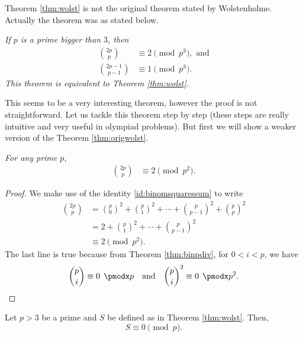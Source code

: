 \documentclass[12pt]{subfile}
\begin{document}
		\begin{remark}
			Theorem \eqref{thm:wolst} is not the original theorem stated by Wolstenholme. Actually the theorem was as stated below.
		\end{remark}
	
		\begin{theorem}\slshape\label{thm:origwolst}
			If $p$ is a prime bigger than $3$, then
			\begin{align*}
				\binom{2p}{p} & \equiv2\pmod{p^3}, \text{ and}\\
				\binom{2p-1}{p-1} & \equiv 1 \pmod{p^3}.
			\end{align*}
			This theorem is equivalent to Theorem \ref{thm:wolst}.
		\end{theorem}
	This seems to be a very interesting theorem, however the proof is not straightforward. Let us tackle this theorem step by step (these steps are really intuitive and very useful in olympiad problems). But first we will show a weaker version of the Theorem \ref{thm:origwolst}.
		\begin{theorem}\slshape
			For any prime $p$, 
				\begin{align*}
					\binom{2p}{p} & \equiv2\pmod{p^2}.
				\end{align*}
		\end{theorem}
		
		\begin{proof}
			We make use of the identity \eqref{id:binomsquaressum} to write
				\begin{align*}
					\binom{2p}p & = \binom{p}0^2+\binom{p}{1}^2+\cdots+\binom{p}{p-1}^2+\binom{p}{p}^2\\
								& = 2+\binom{p}{1}^2+\cdots+\binom{p}{p-1}^2\\
								& \equiv2\pmod{p^2}.
				\end{align*}
			The last line is true because from Theorem \ref{thm:binpdiv}, for $0<i<p$, we have
				\begin{equation*}
					\binom{p}{i}  \equiv 0\pmod p \quad \text{and} \quad \binom{p}{i}^2 \equiv 0\pmod{p^2}.
					\qedhere
				\end{equation*}
		\end{proof}
	
		\begin{lemma}\label{lem:wolstproof1}
			Let $p>3$ be a prime and $S$ be defined as in Theorem \ref{thm:wolst}. Then, $$S \equiv 0 \pmod p.$$
		\end{lemma}
		
\end{document}
